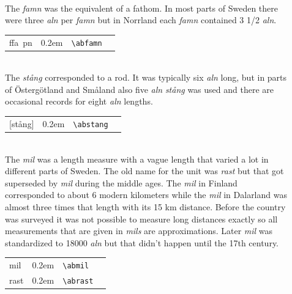 \documentclass[a4paper]{article}
\newcommand{\samplefont}{\fontsize{16}{16}\abcursivefamily\spaceskip0.2em}
\newcommand{\sample}[1]{{\samplefont #1 \strut}}
\newcommand{\ltxncmd}[1]{\texttt{\textbackslash{}#1}}
\begin{document}
\begin{description}
\item [\sample{ffa~pn} \emph{famn}, \emph{syli}] \mbox{} \\
  The \emph{famn} was the equivalent of a fathom. In most parts of
  Sweden there were three \emph{aln} per \emph{famn} but in Norrland
  each \emph{famn} contained 3 1/2 \emph{aln}.
  \begin{center}
    \begin{tabular}{llll}
      {}ffa~pn & \sample{\abfamn} & \ltxncmd{abfamn} \\
    \end{tabular}
  \end{center}

\item [\sample{\abstang} \emph{stång}, \emph{tanko}] \mbox{} \\
  The \emph{stång} corresponded to a rod. It was typically six
  \emph{aln} long, but in parts of Östergötland and Småland also five
  \emph{aln} \emph{stång} was used and there are occasional records
  for eight \emph{aln} lengths.
  \begin{center}
    \begin{tabular}{llll}
      {}[stång] & \sample{\abstang} & \ltxncmd{abstang} \\
    \end{tabular}
  \end{center}

\item [\sample{mil}, \sample{rast} \emph{mil}, \emph{rast}, \emph{peninkulma}] \mbox{} \\
  The \emph{mil} was a length measure with a vague length that varied
  a lot in different parts of Sweden. The old name for the unit was
  \emph{rast} but that got superseded by \emph{mil} during the middle
  ages. The \emph{mil} in Finland corresponded to about 6 modern
  kilometers while the \emph{mil} in Dalarland was almost three times
  that length with its 15 km distance. Before the country was surveyed
  it was not possible to measure long distances exactly so all
  measurements that are given in \emph{mils} are approximations. Later
  \emph{mil} was standardized to 18000 \emph{aln} but that didn't
  happen until the 17th century.
  \begin{center}
    \begin{tabular}{llll}
      {}mil & \sample{\abmil} & \ltxncmd{abmil} \\
      {}rast & \sample{\abrast} & \ltxncmd{abrast} \\
    \end{tabular}
  \end{center}


\end{description}
\end{document}
